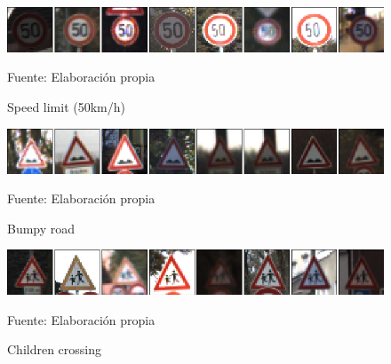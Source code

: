 			\begin{figure}[H]
				\begin{center}
				\includegraphics[width=1\textwidth]{images/desarrollo/imagenes/alemania/1__(3).png}
				\end{center}
				\begin{center}
				\caption{\small{Speed limit (50km/h)}}
				\vskip -0.25cm
				{\small{Fuente: Elaboración propia}}
				\end{center}
				\vspace{-1.5em}
			\end{figure}

			
			\begin{figure}[H]
				\begin{center}
				\includegraphics[width=1\textwidth]{images/desarrollo/imagenes/alemania/1__(23).png}
				\end{center}
				\begin{center}
				\caption{\small{Bumpy road}}
				\vskip -0.25cm
				{\small{Fuente: Elaboración propia}}
				\end{center}
				\vspace{-1.5em}
			\end{figure}

			\begin{figure}[H]
				\begin{center}
				\includegraphics[width=1\textwidth]{images/desarrollo/imagenes/alemania/1__(29).png}
				\end{center}
				\begin{center}
				\vskip -0.25cm
				{\small{Fuente: Elaboración propia}}
				\caption{\small{Children crossing}}
				\end{center}
				\vspace{-1.5em}
			\end{figure}
			
